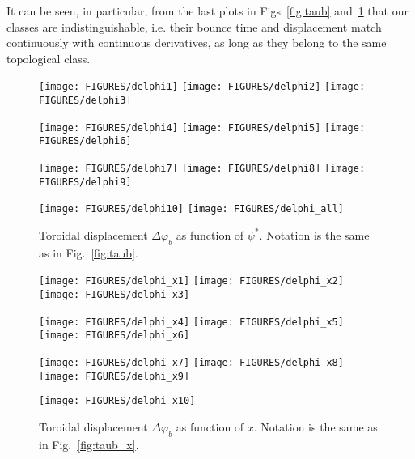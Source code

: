 \documentclass[preprint,prb,aps]{revtex4-1}
\begin{document}
It can be seen, in particular, from the last plots in Figs~\ref{fig:taub}
and~\ref{fig:delphi} that our classes are indistinguishable, i.e. their bounce 
time and displacement match continuously with continuous derivatives,
as long as they belong to the same topological class.
%
\begin{figure}[ht]
\centerline{
\texttt{[image: FIGURES/delphi1]}
\texttt{[image: FIGURES/delphi2]}
\texttt{[image: FIGURES/delphi3]}
}
\centerline{
\texttt{[image: FIGURES/delphi4]}
\texttt{[image: FIGURES/delphi5]}
\texttt{[image: FIGURES/delphi6]}
}
\centerline{
\texttt{[image: FIGURES/delphi7]}
\texttt{[image: FIGURES/delphi8]}
\texttt{[image: FIGURES/delphi9]}
}
\centerline{
\texttt{[image: FIGURES/delphi10]}
\texttt{[image: FIGURES/delphi\_all]}
}
\caption[]{
Toroidal displacement $\Delta\varphi_b$ as function of $\psi^\ast$. 
Notation is the same as in Fig.~\ref{fig:taub}.
}
\label{fig:delphi}
\end{figure}

\begin{figure}[ht]
\centerline{
\texttt{[image: FIGURES/delphi\_x1]}
\texttt{[image: FIGURES/delphi\_x2]}
\texttt{[image: FIGURES/delphi\_x3]}
}
\centerline{
\texttt{[image: FIGURES/delphi\_x4]}
\texttt{[image: FIGURES/delphi\_x5]}
\texttt{[image: FIGURES/delphi\_x6]}
}
\centerline{
\texttt{[image: FIGURES/delphi\_x7]}
\texttt{[image: FIGURES/delphi\_x8]}
\texttt{[image: FIGURES/delphi\_x9]}
}
\centerline{
\texttt{[image: FIGURES/delphi\_x10]}
}
\caption[]{
Toroidal displacement $\Delta\varphi_b$ as function of $x$.
Notation is the same as in Fig.~\ref{fig:taub_x}.
}
\label{fig:delphi_x}
\end{figure}
\end{document}
